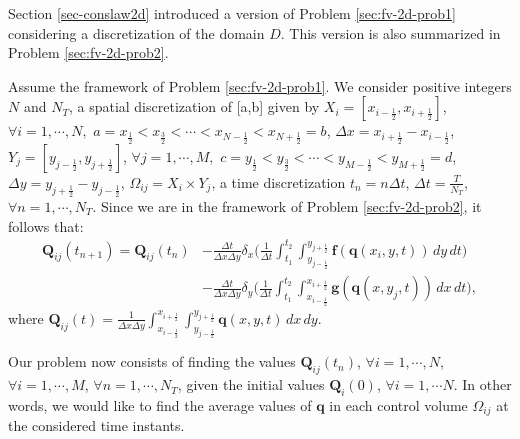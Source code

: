 Section \ref{sec-conslaw2d} introduced a version of Problem \ref{sec:fv-2d-prob1}
considering a discretization of the domain $D$. 
This version is also summarized in Problem \ref{sec:fv-2d-prob2}.
\begin{prob}
	\label{sec:fv-2d-prob2}
	Assume the framework of Problem \ref{sec:fv-2d-prob1}.
	We consider positive integers $N$ and $N_T$, a spatial discretization of [a,b] given by
	$X_i = [x_{i-\frac{1}{2}}, x_{i+\frac{1}{2}}]$,
	$\forall i = 1, \cdots, N,$ 
	$a = x_{\frac{1}{2}} < x_{\frac{3}{2}} < \cdots < x_{N-\frac{1}{2}} < x_{N+\frac{1}{2}} = b$,
	$\Delta x = x_{i+\frac{1}{2}}-x_{i-\frac{1}{2}}$, $Y_j = [y_{j-\frac{1}{2}}, y_{j+\frac{1}{2}}]$,
	$\forall j = 1, \cdots, M,$ 
	$c = y_{\frac{1}{2}} < y_{\frac{3}{2}} < \cdots < y_{M-\frac{1}{2}} < y_{M+\frac{1}{2}} = d$,
	$\Delta y = y_{j+\frac{1}{2}}-y_{j-\frac{1}{2}}$,
	$\Omega_{ij} = X_i \times Y_j$,
	a time discretization
	$t_n = n\Delta t$, $\Delta t = \frac{T}{N_T}$, $\forall n = 1, \cdots, N_T$.
	Since we are in the framework of Problem \ref{sec:fv-2d-prob2}, it follows that:
	\begin{align*}
		\mathbf{Q}_{ij}(t_{n+1})  = \mathbf{Q}_{ij}(t_{n})
		&- \frac{\Delta t}{\Delta x \Delta y}
		\delta _x \bigg( \frac{1}{\Delta t}
		\int_{t_1}^{t_2} \int_{y_{j-\frac{1}{2}}}^{y_{j+\frac{1}{2}}} 
		\mathbf{f}(\mathbf{q}(x_{i}, y, t))
		\,dy \,dt \bigg) \\ \nonumber
		&- \frac{\Delta t}{\Delta x \Delta y}
		\delta _y \bigg( \frac{1}{\Delta t}
		\int_{t_1}^{t_2} \int_{x_{i-\frac{1}{2}}}^{x_{i+\frac{1}{2}}} 
		\mathbf{g}(\mathbf{q}(x, y_{j}, t))
		\,dx \,dt \bigg),
	\end{align*}
	where $\mathbf{Q}_{ij}(t) = \frac{1}{\Delta x \Delta y}
	\int_{x_{i-\frac{1}{2}}}^{x_{i+\frac{1}{2}}} 
	\int_{y_{j-\frac{1}{2}}}^{y_{j+\frac{1}{2}}} \mathbf{q}(x,y,t) \,dx \,dy$.
	
	Our problem now consists of finding the values $\mathbf{Q}_{ij}(t_{n})$, 
	$\forall i = 1, \cdots, N$, $\forall i = 1, \cdots, M$, $\forall n = 1, \cdots, N_T$,
	given the initial values $\mathbf{Q}_i(0)$, $\forall i = 1, \cdots N$.
	In other words, we would like to find the average values of $\mathbf{q}$
	in each control volume $\Omega_{ij}$ at the considered time instants.
\end{prob}

